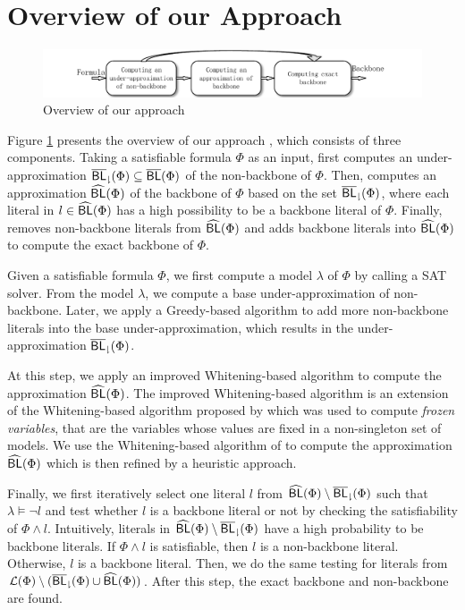 \section{Overview of our Approach}\label{sec:walg}
\begin{figure}
\centering
   \includegraphics[scale=0.9]{Framework}
   \caption{Overview of our approach}
   \label{flow}
\end{figure}

Figure \ref{flow} presents the overview of our approach \tool, which consists of three components. Taking a satisfiable formula
$\Phi$ as an input, \tool first computes an under-approximation ${\sf \overline{BL}_\downharpoonright}(\Phi)\subseteq \overline{\textsf{BL}}(\Phi)$ of the non-backbone of
$\Phi$. Then, \tool computes an approximation ${\sf \widehat{BL}}(\Phi)$ of the backbone of $\Phi$ based on the set ${\sf \overline{BL}_\downharpoonright}(\Phi)$, where each literal in $l\in {\sf \widehat{BL}}(\Phi)$ has a high possibility to be a backbone literal of $\Phi$.
Finally, \tool removes non-backbone literals from ${\sf \widehat{BL}}(\Phi)$ and adds backbone literals into ${\sf \widehat{BL}}(\Phi)$ to compute the exact backbone of $\Phi$.

\medskip
{}
Given a satisfiable formula $\Phi$, we first compute a model $\lambda$ of $\Phi$ by calling a SAT solver.
From the model $\lambda$, we compute a base under-approximation of non-backbone.
Later, we apply a Greedy-based algorithm to add more non-backbone literals into the base under-approximation, which results in the
under-approximation ${\sf \overline{BL}_\downharpoonright}(\Phi)$.



\medskip
{}
At this step, we apply an improved Whitening-based algorithm to compute the approximation ${\sf \widehat{BL}}(\Phi)$.
The improved Whitening-based algorithm is an extension of the Whitening-based algorithm proposed by \cite{LMZ09} which
was used to compute \emph{frozen variables}, that are the variables whose values are fixed in a non-singleton set of models.
We use the Whitening-based algorithm of \cite{LMZ09} to compute the approximation ${\sf \widehat{BL}}(\Phi)$ which is then refined by
a heuristic approach.


\medskip
{}
Finally, we first iteratively select one literal $l$ from ${\sf \widehat{BL}}(\Phi)\setminus {\sf \overline{BL}_\downharpoonright}(\Phi)$ such that $\lambda \models \neg l$ and test whether
$l$ is a backbone literal or not by checking the satisfiability of $\Phi\wedge l$. Intuitively, literals in ${\sf \widehat{BL}}(\Phi)\setminus {\sf \overline{BL}_\downharpoonright}(\Phi)$ have a high probability to be backbone literals.
If $\Phi\wedge l$ is satisfiable, then $l$ is a non-backbone literal.
Otherwise, $l$ is a backbone literal. Then, we do the same testing for literals from ${\cal L}(\Phi)\setminus ({\sf \overline{BL}_\downharpoonright}(\Phi)\cup{\sf \widehat{BL}}(\Phi))$.
After this step, the exact backbone and non-backbone are found.



